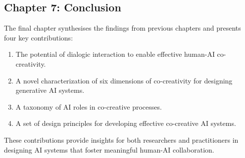 \subsection{Chapter 7: Conclusion}

The final chapter synthesises the findings from previous chapters and presents four key contributions:

\begin{enumerate}[label=\arabic.]
    \item The potential of dialogic interaction to enable effective human-AI co-creativity.
    \item A novel characterization of six dimensions of co-creativity for designing generative AI systems.
    \item A taxonomy of AI roles in co-creative processes.
    \item A set of design principles for developing effective co-creative AI systems.
\end{enumerate}

These contributions provide insights for both researchers and practitioners in designing AI systems that foster meaningful human-AI collaboration.